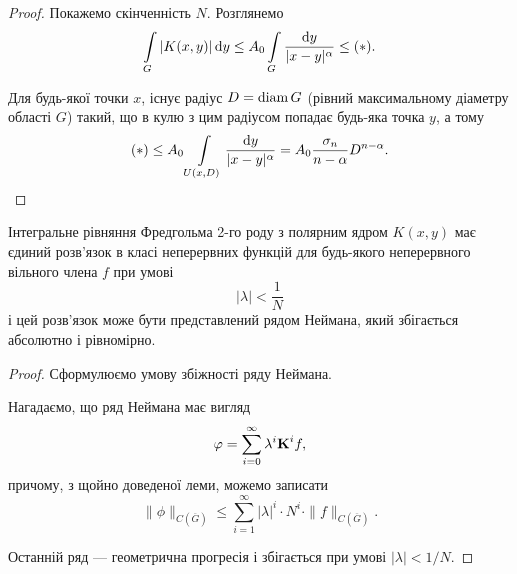\begin{proof}
	Покажемо скінченність $N$. Розглянемо 
	\begin{equation}
		\Int_G |K(x,y)| \diff y \le A_0 \Int_G \dfrac{\diff y}{|x - y|^\alpha} \le (*).
	\end{equation}

	Для будь-якої точки $x$, існує радіус $D = \diam G$ (рівний максимальному діаметру області $G$) такий, що в кулю з цим радіусом попадає будь-яка точка $y$, а тому
	\begin{equation}
		(*) \le A_0 \Int_{U(x, D)} \dfrac{\diff y}{|x - y|^\alpha} = A_0 \dfrac{\sigma_n}{n - \alpha} D^{n - \alpha}.
	\end{equation}
\end{proof}

\begin{theorem}
	Інтегральне рівняння Фредгольма 2-го роду з полярним ядром $K(x, y)$ має єдиний розв'язок в класі неперервних функцій для будь-якого неперервного вільного члена $f$ при умові
	\begin{equation}
		|\lambda| < \dfrac{1}{N}
	\end{equation}
	і цей розв'язок може бути представлений рядом Неймана, який збігається абсолютно і рівномірно.
\end{theorem}

\begin{proof}
	Сформулюємо умову збіжності ряду Неймана. \medskip

	Нагадаємо, що ряд Неймана має вигляд
	\begin{equation}
		\phi = \sum_{i = 0}^\infty \lambda^i \bf{K}^i f,
	\end{equation}
	причому, з щойно доведеної леми, можемо записати
	\begin{equation}
		\|\phi\|_{C\left(\overline G\right)} \le \sum_{i = 1}^\infty |\lambda|^i \cdot N^i \cdot \|f\|_{C(\overline G)}.
	\end{equation}

	Останній ряд --- геометрична прогресія і збігається при умові $|\lambda| < 1 / N$.
\end{proof}


